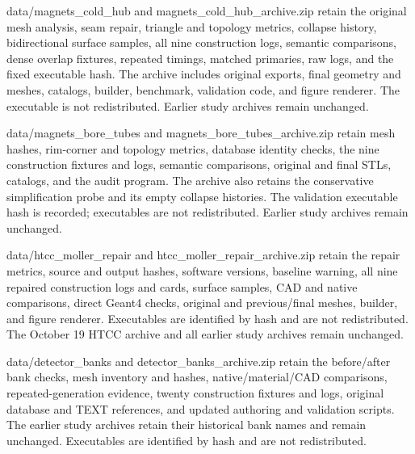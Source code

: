 data/magnets\_cold\_hub and magnets\_cold\_hub\_archive.zip retain the original mesh analysis, seam repair,
triangle and topology metrics, collapse history, bidirectional surface samples, all nine construction logs,
semantic comparisons, dense overlap fixtures, repeated timings, matched primaries, raw logs, and the fixed
executable hash. The archive includes original exports, final geometry and meshes, catalogs, builder,
benchmark, validation code, and figure renderer. The executable is not redistributed. Earlier study archives
remain unchanged.


data/magnets\_bore\_tubes and magnets\_bore\_tubes\_archive.zip retain mesh hashes, rim-corner and topology
metrics, database identity checks, the nine construction fixtures and logs, semantic comparisons, original and
final STLs, catalogs, and the audit program. The archive also retains the conservative simplification probe
and its empty collapse histories. The validation executable hash is recorded; executables are not
redistributed. Earlier study archives remain unchanged.


data/htcc\_moller\_repair and htcc\_moller\_repair\_archive.zip retain the repair metrics, source and output
hashes, software versions, baseline warning, all nine repaired construction logs and cards, surface samples,
CAD and native comparisons, direct Geant4 checks, original and previous/final meshes, builder, and figure
renderer. Executables are identified by hash and are not redistributed. The October 19 HTCC archive and all
earlier study archives remain unchanged.


data/detector\_banks and detector\_banks\_archive.zip retain the before/after bank checks, mesh inventory and
hashes, native/material/CAD comparisons, repeated-generation evidence, twenty construction fixtures and logs,
original database and TEXT references, and updated authoring and validation scripts. The earlier study
archives retain their historical bank names and remain unchanged. Executables are identified by hash and are
not redistributed.
